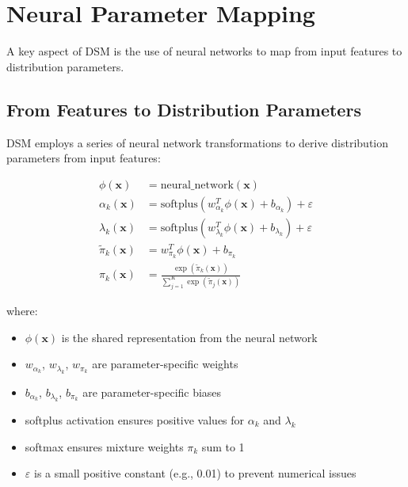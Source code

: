 \section{Neural Parameter Mapping}

A key aspect of DSM is the use of neural networks to map from input features to distribution parameters.

\subsection{From Features to Distribution Parameters}

DSM employs a series of neural network transformations to derive distribution parameters from input features:

\begin{equationbox}[title=Neural Parameter Mapping]
\begin{align}
    \phi(\mathbf{x}) &= \text{neural\_network}(\mathbf{x}) \\
    \alpha_k(\mathbf{x}) &= \text{softplus}(w_{\alpha_k}^T \phi(\mathbf{x}) + b_{\alpha_k}) + \varepsilon \\
    \lambda_k(\mathbf{x}) &= \text{softplus}(w_{\lambda_k}^T \phi(\mathbf{x}) + b_{\lambda_k}) + \varepsilon \\
    \tilde{\pi}_k(\mathbf{x}) &= w_{\pi_k}^T \phi(\mathbf{x}) + b_{\pi_k} \\
    \pi_k(\mathbf{x}) &= \frac{\exp(\tilde{\pi}_k(\mathbf{x}))}{\sum_{j=1}^{K} \exp(\tilde{\pi}_j(\mathbf{x}))}
\end{align}

where:
\begin{itemize}
    \item $\phi(\mathbf{x})$ is the shared representation from the neural network
    \item $w_{\alpha_k}$, $w_{\lambda_k}$, $w_{\pi_k}$ are parameter-specific weights
    \item $b_{\alpha_k}$, $b_{\lambda_k}$, $b_{\pi_k}$ are parameter-specific biases
    \item softplus activation ensures positive values for $\alpha_k$ and $\lambda_k$
    \item softmax ensures mixture weights $\pi_k$ sum to 1
    \item $\varepsilon$ is a small positive constant (e.g., 0.01) to prevent numerical issues
\end{itemize}
\end{equationbox}

